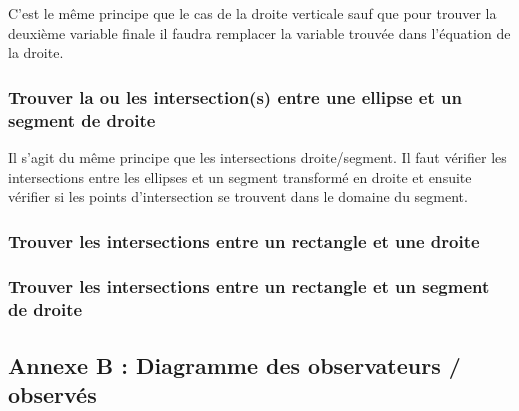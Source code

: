 \documentclass[]{report}
\begin{document}
C'est le même principe que le cas de la droite verticale sauf
que pour trouver la deuxième variable finale il faudra
remplacer la variable trouvée dans l'équation de la droite.

\subsubsection{Trouver la ou les intersection(s) entre une ellipse et un segment de droite}

Il s'agit du même principe que les intersections droite/segment.
Il faut vérifier les intersections entre les ellipses et un segment
transformé en droite et ensuite vérifier si les points d'intersection
se trouvent dans le domaine du segment.

\subsubsection{Trouver les intersections entre un rectangle et une droite}

\subsubsection{Trouver les intersections entre un rectangle et un segment de droite}

\subsection{\label{AnnexeB}Annexe B : Diagramme des observateurs / observés}
\end{document}
